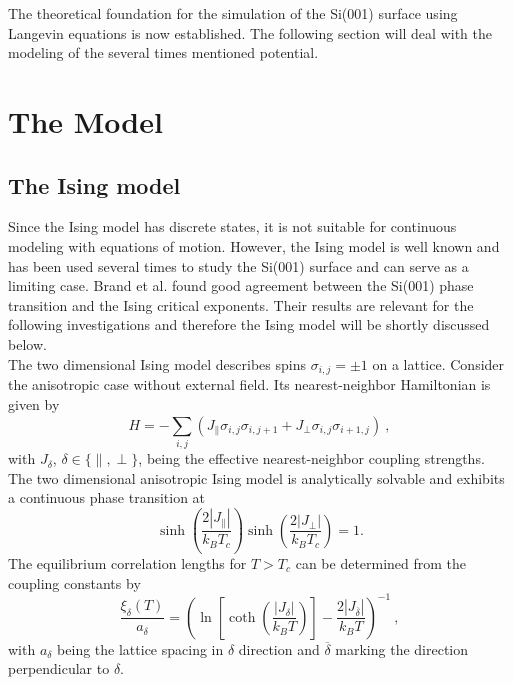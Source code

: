 	The theoretical foundation for the simulation of the Si(001) surface using Langevin equations is now established. The following section will deal with the modeling of the several times mentioned potential.
	\section{The Model}
	\subsection{The Ising model} \label{Section::Ising-Model}		
	Since the Ising model has discrete states, it is not suitable for continuous modeling with equations of motion. However, the Ising model is well known and has been used several times \cite{brand2023dimer, pillay2004revisit, ihm1983structural, schaller2023sequential} to study the Si(001) surface and can serve as a limiting case. Brand et al. \cite{brand2023critical} found good agreement between the Si(001) phase transition and the Ising critical exponents.  Their results are relevant for the following investigations and therefore the Ising model will be shortly discussed below. \\
	
	The two dimensional Ising model describes spins $\sigma_{i ,j} =	\pm 1$ on a lattice. Consider the anisotropic case without external field. Its nearest-neighbor Hamiltonian is given by
	\begin{equation} \label{Eq::Ising-Hamiltonian}
		H =	- \sum_{i,j}^{} \left(J_\parallel \sigma_{i ,j} \sigma_{i ,j + 1} + J_\perp \sigma_{i, j} \sigma_{i +1 ,j} \right) ~,
	\end{equation}
	with $J_{\delta}$, $\delta \in \{\parallel, \perp\}$, being the effective nearest-neighbor coupling strengths. The two dimensional anisotropic Ising model is analytically solvable \cite{onsager1944crystal} and exhibits a continuous phase transition at
	\begin{equation} \label{Eq::Crit-Temp-Ising}
		\sinh \left( \frac{2 |J_\parallel|}{k_B T_c} \right) \sinh \left( \frac{2 |J_\perp|}{k_B T_c}\right) =	1.
	\end{equation}
	The equilibrium correlation lengths for $T > T_c$ can be determined from the coupling constants \cite{mccoy1973two} by
	\begin{equation} \label{Eq::Ising-Corrlength-Coupling}
		\frac{\xi_\delta(T)}{a_\delta} =	\left(\ln \left[ \coth \left(\frac{|J_\delta|}{k_B T}\right)\right] - \frac{2 |J_{\overline{\delta}}|}{k_B T}\right)^{-1} ~,
	\end{equation}
	with $a_\delta$ being the lattice spacing in $\delta$ direction and $\overline{\delta}$ marking the direction perpendicular to $\delta$. \\
	
